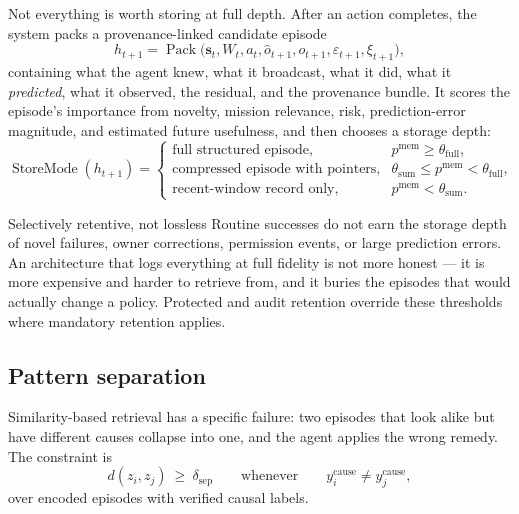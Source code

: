 \documentclass[11pt]{article}
\newcommand{\op}[1]{\operatorname{#1}}
\begin{document}
Not everything is worth storing at full depth. After an action completes, the system packs a provenance-linked candidate episode
\begin{equation}
h_{t+1}=\op{Pack}\big(\mathbf{s}_t,W_t,a_t,\hat{o}_{t+1},o_{t+1},\varepsilon_{t+1},\xi_{t+1}\big),
\label{eq:pack}
\end{equation}
containing what the agent knew, what it broadcast, what it did, what it \emph{predicted}, what it observed, the residual, and the provenance bundle. It scores the episode's importance from novelty, mission relevance, risk, prediction-error magnitude, and estimated future usefulness, and then chooses a storage depth:
\begin{equation}
\op{StoreMode}(h_{t+1})=
\begin{cases}
\text{full structured episode}, & p^{\mathrm{mem}}\ge\theta_{\mathrm{full}},\\
\text{compressed episode with pointers}, & \theta_{\mathrm{sum}}\le p^{\mathrm{mem}}<\theta_{\mathrm{full}},\\
\text{recent-window record only}, & p^{\mathrm{mem}}<\theta_{\mathrm{sum}}.
\end{cases}
\label{eq:storemode}
\end{equation}

\begin{claimbox}{Selectively retentive, not lossless}
Routine successes do not earn the storage depth of novel failures, owner corrections, permission events, or large prediction errors. An architecture that logs everything at full fidelity is not more honest --- it is more expensive and harder to retrieve from, and it buries the episodes that would actually change a policy. Protected and audit retention override these thresholds where mandatory retention applies.
\end{claimbox}

\subsection{Pattern separation}

Similarity-based retrieval has a specific failure: two episodes that look alike but have different causes collapse into one, and the agent applies the wrong remedy. The constraint is
\begin{equation}
d(z_i,z_j)\ \ge\ \delta_{\mathrm{sep}}\qquad\text{whenever}\qquad y^{\mathrm{cause}}_i\neq y^{\mathrm{cause}}_j,
\label{eq:patsep}
\end{equation}
over encoded episodes with verified causal labels.
\end{document}
